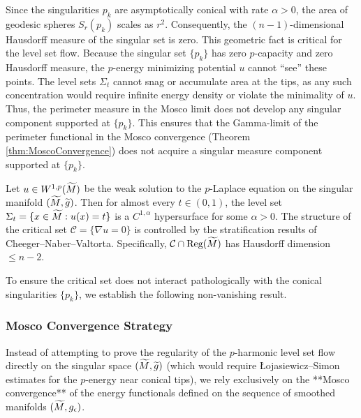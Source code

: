\begin{lemma}\label{lem:NoGhostArea}
Since the singularities $p_k$ are asymptotically conical with rate $\alpha > 0$, the area of geodesic spheres $S_r(p_k)$ scales as $r^2$.
Consequently, the $(n-1)$-dimensional Hausdorff measure of the singular set is zero.
This geometric fact is critical for the level set flow. Because the singular set $\{p_k\}$ has zero $p$-capacity and zero Hausdorff measure, the $p$-energy minimizing potential $u$ cannot ``see'' these points. The level sets $\Sigma_t$ cannot snag or accumulate area at the tips, as any such concentration would require infinite energy density or violate the minimality of $u$. Thus, the perimeter measure in the Mosco limit does not develop any singular component supported at $\{p_k\}$.
This ensures that the Gamma-limit of the perimeter functional in the Mosco convergence (Theorem \ref{thm:MoscoConvergence}) does not acquire a singular measure component supported at $\{p_k\}$.
\end{lemma}

\begin{theorem}\label{thm:LevelSetRegularity}
Let $u \in W^{1,p}(\widetilde{M})$ be the weak solution to the $p$-Laplace equation on the singular manifold $(\widetilde{M}, \widetilde{g})$. Then for almost every $t \in (0,1)$, the level set $\Sigma_t = \{x \in \widetilde{M} : u(x)=t\}$ is a $C^{1,\alpha}$ hypersurface for some $\alpha > 0$.
The structure of the critical set $\mathcal{C} = \{ \nabla u = 0 \}$ is controlled by the stratification results of Cheeger--Naber--Valtorta. Specifically, $\mathcal{C} \cap \text{Reg}(\widetilde{M})$ has Hausdorff dimension $\le n-2$.
\end{theorem}
To ensure the critical set does not interact pathologically with the conical singularities $\{p_k\}$, we establish the following non-vanishing result.

\subsubsection{Mosco Convergence Strategy}
Instead of attempting to prove the regularity of the $p$-harmonic level set flow directly on the singular space $(\widetilde{M}, \widetilde{g})$ (which would require \L{}ojasiewicz--Simon estimates for the $p$-energy near conical tips), we rely exclusively on the **Mosco convergence** of the energy functionals defined on the sequence of smoothed manifolds $(\widetilde{M}, g_{\epsilon})$.

